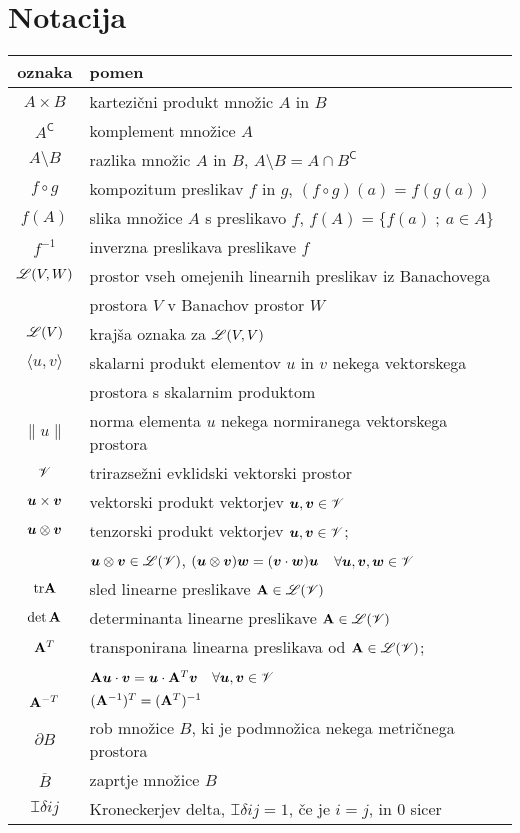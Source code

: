\chapter*{Notacija}


\begin{center}\begin{tabular}[h]{|c|p{11cm}|}
	\hline oznaka & pomen \\ \hline%
	$A\times B$ & kartezični produkt množic $A$ in $B$ \\ %
	$A^{\mathsf C}$ & komplement množice $A$ \\ %
	$A\setminus B$ & razlika množic $A$ in $B$, $A\setminus B=A\cap B^{\mathsf C}$ \\ %
	$f\circ g$ & kompozitum preslikav $f$ in $g$, $(f\circ g)(a)=f(g(a))$ \\ %
	$f(A)$ & slika množice $A$ s preslikavo $f$, $f(A)=\{f(a)\;;\ a\in A\}$ \\ %
	$f^{-1}$ & inverzna preslikava preslikave $f$ \\ %
	$\mathscr L(V,W)$ & prostor vseh omejenih linearnih preslikav iz Banachovega \\ &
	prostora $V$ v Banachov prostor $W$ \\ %
	$\mathscr L(V)$ & krajša oznaka za $\mathscr L(V,V)$ \\ %
	$\langle u,v\rangle$ & skalarni produkt elementov $u$ in $v$ nekega vektorskega \\ &
	prostora s skalarnim produktom \\ %
	$\|u\|$ & norma elementa $u$ nekega normiranega vektorskega prostora \\ %
	$\mathscr V$ & trirazsežni evklidski vektorski prostor \\ %
	$\boldsymbol u\times\boldsymbol v$ & vektorski produkt vektorjev $\boldsymbol u,\boldsymbol v\in\mathscr V$ \\ %
	$\boldsymbol u\otimes\boldsymbol v$ & tenzorski produkt vektorjev $\boldsymbol u,\boldsymbol v\in\mathscr V$; \\
	& $\boldsymbol u\otimes\boldsymbol v\in\mathscr L(\mathscr V)$, $(\boldsymbol u\otimes\boldsymbol v)\boldsymbol w=
	(\boldsymbol v\cdot\boldsymbol w)\boldsymbol u$ \ $\forall\boldsymbol u,\boldsymbol v,\boldsymbol w\in\mathscr V$ \\ %
	$\mathrm{tr}\mathbf A$ & sled linearne preslikave $\mathbf A\in\mathscr L(\mathscr V)$ \\ %
	$\det\mathbf A$ & determinanta linearne preslikave $\mathbf A\in\mathscr L(\mathscr V)$ \\ %
	$\mathbf A^{T}$ & transponirana linearna preslikava od $\mathbf A\in\mathscr L(\mathscr V)$; \\
	& $\mathbf A\boldsymbol u\cdot\boldsymbol v=\boldsymbol u\cdot\mathbf A^{T}\boldsymbol v$ \ $\forall\boldsymbol u,\boldsymbol v\in\mathscr V$ \\ %
	$\mathbf A^{-T}$ & $(\mathbf A^{-1})^{T}=(\mathbf A^{T})^{-1}$ \\ %
	$\partial B$ & rob množice $B$, ki je podmnožica nekega metričnega prostora \\ %
	$\overline{B}$ & zaprtje množice $B$ \\ %
	$\topbot{\delta}{i}{j}$ & Kroneckerjev delta, $\topbot{\delta}{i}{j}=1$, če je $i=j$, in 0 sicer \\ \hline
\end{tabular}\end{center}

